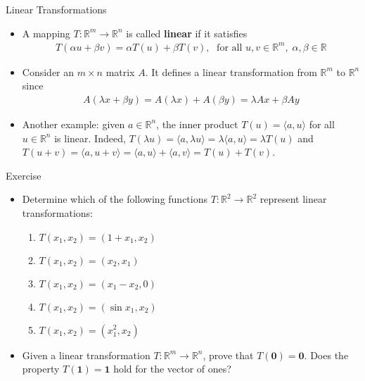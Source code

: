 \begin{frame}{Linear Transformations}
\begin{itemize}
    \item A mapping $T:\mathbb{R}^m \rightarrow \mathbb{R}^n$ is called \textbf{linear} if it satisfies
\begin{align}
    T(\alpha u + \beta v ) = \alpha T(u) + \beta T(v),\; \text{ for all } u, v\in \mathbb{R}^m, \; \alpha, \beta\in \mathbb{R}
\end{align}
\item Consider an $m\times n$ matrix $A$. It defines a linear transformation from $\mathbb{R}^m$ to $\mathbb{R}^n$ since
            \begin{align}
                A(\lambda x + \beta y) = A(\lambda x ) + A(\beta y ) = \lambda A x + \beta A y
            \end{align}
\end{itemize}
\end{frame}

\begin{frame}
    \begin{itemize}
      \item Another example: given $a\in \mathbb{R}^n$, the inner product $T(u)=\langle a, u\rangle$ for all $u\in \mathbb{R}^n$ is linear. Indeed, $T(\lambda u ) = \langle a, \lambda u \rangle = \lambda \langle a, u\rangle = \lambda T(u)$ and $T(u + v) = \langle a, u+v \rangle = \langle a, u\rangle+ \langle a, v\rangle = T(u) + T(v)$.
    \end{itemize}
\end{frame}

\begin{frame}{Exercise}
    \begin{itemize}
       \item Determine which of the following functions $T: \mathbb{R}^2 \rightarrow \mathbb{R}^2$ represent linear transformations:
\begin{enumerate}
    \item $T(x_1, x_2)=(1+x_1, x_2)$
    \item $T(x_1, x_2)=(x_2, x_1)$
    \item $T(x_1, x_2)=(x_1-x_2, 0)$
    \item $T(x_1, x_2)=(\sin x_1, x_2)$
    \item $T(x_1, x_2)=(x_1^2, x_2)$
\end{enumerate}
\item Given a linear transformation $T: \mathbb{R}^m\rightarrow \mathbb{R}^n$, prove that $T(\mathbf{0})=\mathbf{0}$. Does the property $T(\mathbf{1})=\mathbf{1}$ hold for the vector of ones?
    \end{itemize}
\end{frame}

